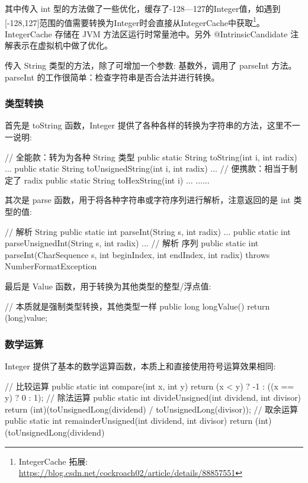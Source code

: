 其中传入 int 型的方法做了一些优化，缓存了-128—127的Integer值，如遇到[-128,127]范围的值需要转换为Integer时会直接从IntegerCache中获取\footnote{IntegerCache 拓展: \url{https://blog.csdn.net/cockroach02/article/details/88857551}}。IntegerCache 存储在 JVM 方法区运行时常量池中。另外 @IntrinsicCandidate 注解表示在虚拟机中做了优化。

传入 String 类型的方法，除了可增加一个参数: 基数外，调用了 parseInt 方法。 parseInt 的工作很简单：检查字符串是否合法并进行转换。

\subsubsection{类型转换}

首先是 toString 函数，Integer 提供了各种各样的转换为字符串的方法，这里不一一说明:

\begin{Java}
// 全能款：转为为各种 String 类型
public static String toString(int i, int radix) { ... }
public static String toUnsignedString(int i, int radix) { ... }
// 便携款：相当于制定了 radix
public static String toHexString(int i) { ... }
......
\end{Java}

其次是 parse 函数，用于将各种字符串或字符序列进行解析，注意返回的是 int 类型的值:

\begin{Java}
// 解析 String
public static int parseInt(String s, int radix) { ... }
public static int parseUnsignedInt(String s, int radix) { ... }
// 解析 序列
public static int parseInt(CharSequence s, int beginIndex, int endIndex, int radix) throws NumberFormatException {}
\end{Java}

最后是 Value 函数，用于转换为其他类型的整型/浮点值:

\begin{Java}
// 本质就是强制类型转换，其他类型一样
public long longValue() { return (long)value; }
\end{Java}

\subsubsection{数学运算}

Integer 提供了基本的数学运算函数，本质上和直接使用符号运算效果相同:

\begin{Java}
// 比较运算
public static int compare(int x, int y) {
    return (x < y) ? -1 : ((x == y) ? 0 : 1);
}
// 除法运算
public static int divideUnsigned(int dividend, int divisor) {
    return (int)(toUnsignedLong(dividend) / toUnsignedLong(divisor));
}
// 取余运算
public static int remainderUnsigned(int dividend, int divisor) {
    return (int)(toUnsignedLong(dividend) %
}
\end{Java}

